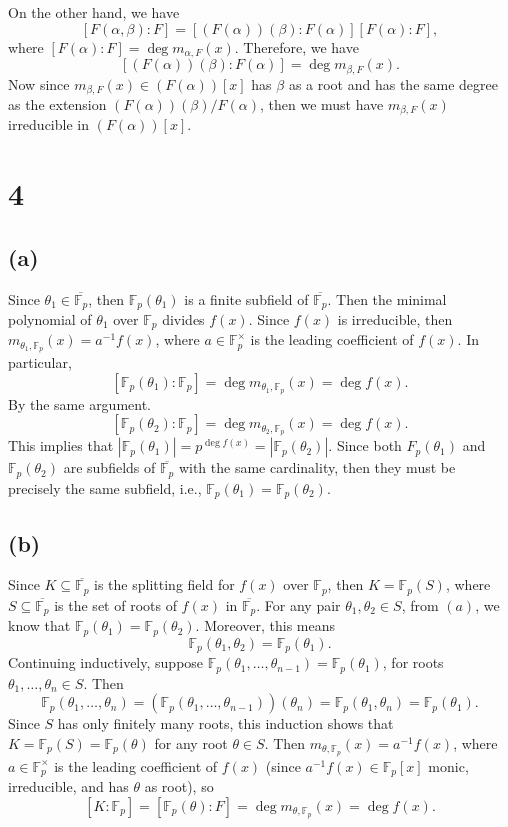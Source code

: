 \documentclass[12pt]{article}
\theoremstyle{definition}
\newcommand{\clo}{\overline}
\newcommand{\F}{\mathbb{F}}
\begin{document}
On the other hand, we have
\[
    [F(\alpha, \beta) : F] = [(F(\alpha))(\beta) : F(\alpha)][F(\alpha) : F],
\]
where $[F(\alpha) : F] = \deg m_{\alpha, F}(x)$. Therefore, we have
\[
    [(F(\alpha))(\beta) : F(\alpha)] = \deg m_{\beta, F}(x).
\]
Now since $m_{\beta, F}(x) \in (F(\alpha))[x]$ has $\beta$ as a root and has the same degree as the extension $(F(\alpha))(\beta)/F(\alpha)$, then we must have $m_{\beta, F}(x)$ irreducible in $(F(\alpha))[x]$.


\newpage
\section*{4}

\subsection*{(a)}

Since $\theta_1 \in \clo{\F_p}$, then $\F_p(\theta_1)$ is a finite subfield of $\clo{\F_p}$. Then the minimal polynomial of $\theta_1$ over $\F_p$ divides $f(x)$. Since $f(x)$ is irreducible, then $m_{\theta_1, \F_p}(x) = a^{-1}f(x)$, where $a \in \F_p^\times$ is the leading coefficient of $f(x)$. In particular,
\[
    [\F_p(\theta_1) : \F_p] = \deg m_{\theta_1, \F_p}(x) = \deg f(x).
\]
By the same argument.
\[
    [\F_p(\theta_2) : \F_p] = \deg m_{\theta_2, \F_p}(x) = \deg f(x).
\]
This implies that $|\F_p(\theta_1)| = p^{\deg f(x)} = |\F_p(\theta_2)|$. Since both $F_p(\theta_1)$ and $\F_p(\theta_2)$ are subfields of $\clo{\F_p}$ with the same cardinality, then they must be precisely the same subfield, i.e., $\F_p(\theta_1) = \F_p(\theta_2)$.


\subsection*{(b)}

Since $K \subseteq \clo{\F_p}$ is the splitting field for $f(x)$ over $\F_p$, then $K = \F_p(S)$, where $S \subseteq \clo{\F_p}$ is the set of roots of $f(x)$ in $\clo{\F_p}$. For any pair $\theta_1, \theta_2 \in S$, from $(a)$, we know that $\F_p(\theta_1) = \F_p(\theta_2)$. Moreover, this means
\[
    \F_p(\theta_1, \theta_2) = \F_p(\theta_1).
\]
Continuing inductively, suppose $\F_p(\theta_1, \dots, \theta_{n - 1}) = \F_p(\theta_1)$, for roots $\theta_1, \dots, \theta_n \in S$. Then 
\[
    \F_p(\theta_1, \dots, \theta_n)
        = (\F_p(\theta_1, \dots, \theta_{n - 1}))(\theta_n)
        = \F_p(\theta_1, \theta_n)
        = \F_p(\theta_1).
\]
Since $S$ has only finitely many roots, this induction shows that $K = \F_p(S) = \F_p(\theta)$ for any root $\theta \in S$. Then $m_{\theta, \F_p}(x) = a^{-1}f(x)$, where $a \in \F_p^\times$ is the leading coefficient of $f(x)$ (since $a^{-1}f(x) \in \F_p[x]$ monic, irreducible, and has $\theta$ as root), so
\[
    [K : \F_p] = [\F_p(\theta) : F] = \deg m_{\theta, \F_p}(x) = \deg f(x).
\]
\end{document}
